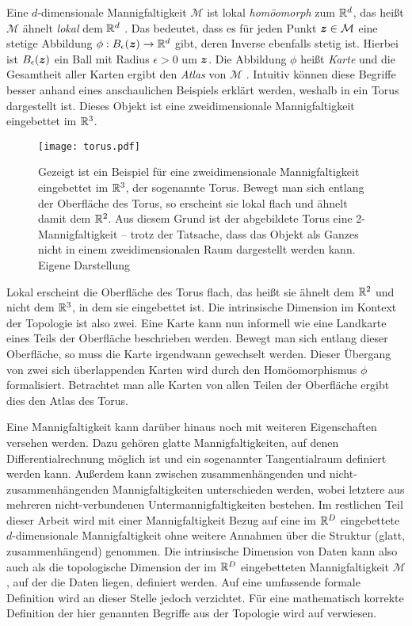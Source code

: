 Eine $d$-dimensionale Mannigfaltigkeit $\mathcal{M}$ ist lokal \textit{homöomorph} zum $\mathbb{R}^d$,
das heißt $\mathcal{M}$ ähnelt \textit{lokal} dem $\mathbb{R}^d$ \parencite[3]{Lee.2011}. Das bedeutet, dass es für jeden Punkt $\bm{z} \in \mathcal{M}$ eine stetige
Abbildung $\phi: B_\epsilon(\bm{z}) \rightarrow \mathbb{R}^d$ gibt, deren Inverse ebenfalls stetig
ist. Hierbei ist $B_\epsilon(\bm{z})$ ein Ball mit Radius $\epsilon > 0$ um $\bm{z}$. Die
Abbildung $\phi$ heißt \textit{Karte} und die Gesamtheit aller Karten ergibt den \textit{Atlas} von
$\mathcal{M}$ \parencite[4]{Cayton.2005}. Intuitiv können diese Begriffe besser anhand eines anschaulichen Beispiels
erklärt werden, weshalb in  ein Torus dargestellt ist. Dieses Objekt ist eine
zweidimensionale Mannigfaltigkeit eingebettet im $\mathbb{R}^3$.
\begin{figure}[ht]
	\centering
	\texttt{[image: torus.pdf]}
	\caption[Ein Beispiel für eine zweidimensionale Mannigfaltigkeit: ein Torus]{Gezeigt ist ein Beispiel für eine zweidimensionale Mannigfaltigkeit eingebettet im $\mathbb{R}^3$, der sogenannte Torus. Bewegt man sich entlang der Oberfläche des Torus, so erscheint sie lokal flach und ähnelt damit dem $\mathbb{R}^2$. Aus diesem Grund ist der abgebildete Torus eine 2-Mannigfaltigkeit -- trotz der Tatsache, dass das Objekt als Ganzes nicht in einem zweidimensionalen Raum dargestellt werden kann. Eigene Darstellung\protect\footnotemark}
	\label{fig:Torus}
\end{figure}
Lokal erscheint die Oberfläche des Torus flach, das heißt sie ähnelt dem $\mathbb{R}^2$ und nicht dem $\mathbb{R}^3$, in dem sie eingebettet ist. Die intrinsische Dimension im Kontext der Topologie ist also zwei. Eine Karte kann nun informell wie eine Landkarte eines Teils der Oberfläche beschrieben werden. Bewegt man sich entlang
dieser Oberfläche, so muss die Karte irgendwann gewechselt werden. Dieser Übergang von zwei sich
überlappenden Karten wird durch den Homöomorphismus $\phi$ formalisiert. Betrachtet man alle Karten
von allen Teilen der Oberfläche ergibt dies den Atlas des Torus.

Eine Mannigfaltigkeit kann darüber hinaus noch mit weiteren Eigenschaften versehen werden. Dazu
gehören glatte Mannigfaltigkeiten, auf denen Differentialrechnung möglich ist und ein sogenannter
Tangentialraum definiert werden kann. Außerdem kann zwischen zusammenhängenden und
nicht-zusammenhängenden Mannigfaltigkeiten unterschieden werden, wobei letztere aus mehreren
nicht-verbundenen Untermannigfaltigkeiten bestehen. Im restlichen Teil dieser Arbeit wird mit einer
Mannigfaltigkeit Bezug auf eine im $\mathbb{R}^D$ eingebettete $d$-dimensionale Mannigfaltigkeit ohne
weitere Annahmen über die Struktur (glatt, zusammenhängend) genommen. Die intrinsische Dimension
von Daten kann also auch als die topologische Dimension der im $\mathbb{R}^D$ eingebetteten
Mannigfaltigkeit $\mathcal{M}$, auf der die Daten liegen, definiert werden. Auf eine umfassende
formale Definition wird an dieser Stelle jedoch verzichtet. Für eine mathematisch korrekte
Definition der hier genannten Begriffe aus der Topologie wird auf \textcites{Lee.2011}{Lee.2012}
verwiesen.


